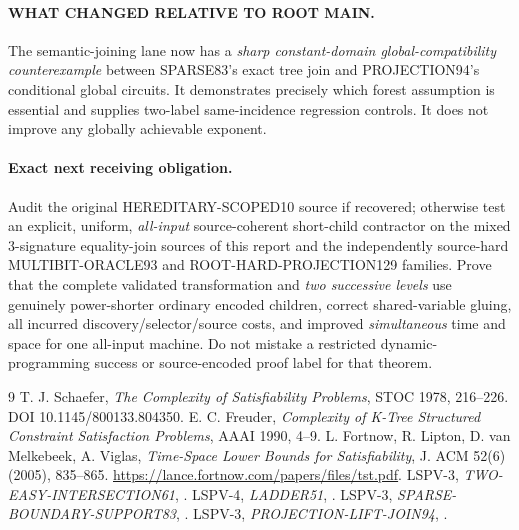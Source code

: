 \documentclass[11pt]{article}
\begin{document}
\paragraph{WHAT CHANGED RELATIVE TO ROOT MAIN.}
The semantic-joining lane now has a \emph{sharp constant-domain global-compatibility counterexample} between SPARSE83's exact tree join and PROJECTION94's conditional global circuits. It demonstrates precisely which forest assumption is essential and supplies two-label same-incidence regression controls. It does not improve any globally achievable exponent.

\paragraph{Exact next receiving obligation.}
Audit the original HEREDITARY-SCOPED10 source if recovered; otherwise test an explicit, uniform, \emph{all-input} source-coherent short-child contractor on the mixed 3-signature equality-join sources of this report and the independently source-hard MULTIBIT-ORACLE93 and ROOT-HARD-PROJECTION129 families. Prove that the complete validated transformation and \emph{two successive levels} use genuinely power-shorter ordinary encoded children, correct shared-variable gluing, all incurred discovery/selector/source costs, and improved \emph{simultaneous} time and space for one all-input machine. Do not mistake a restricted dynamic-programming success or source-encoded proof label for that theorem.

\begin{thebibliography}{9}
 T. J. Schaefer, \emph{The Complexity of Satisfiability Problems}, STOC 1978, 216--226. DOI 10.1145/800133.804350.
 E. C. Freuder, \emph{Complexity of K-Tree Structured Constraint Satisfaction Problems}, AAAI 1990, 4--9.
 L. Fortnow, R. Lipton, D. van Melkebeek, A. Viglas, \emph{Time-Space Lower Bounds for Satisfiability}, J. ACM 52(6) (2005), 835--865. \url{https://lance.fortnow.com/papers/files/tst.pdf}.
 LSPV-3, \emph{TWO-EASY-INTERSECTION61}, .
 LSPV-4, \emph{LADDER51}, .
 LSPV-3, \emph{SPARSE-BOUNDARY-SUPPORT83}, .
 LSPV-3, \emph{PROJECTION-LIFT-JOIN94}, .
\end{thebibliography}
\end{document}
